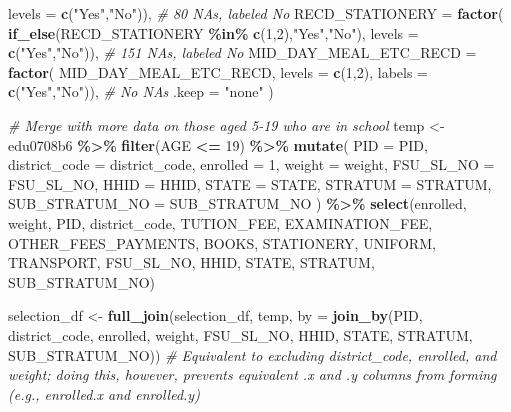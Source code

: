 \documentclass[
]{article}
\newenvironment{Shaded}{\begin{snugshade}}{\end{snugshade}}
\newcommand{\AttributeTok}[1]{\textcolor[rgb]{0.13,0.29,0.53}{#1}}
\newcommand{\CommentTok}[1]{\textcolor[rgb]{0.56,0.35,0.01}{\textit{#1}}}
\newcommand{\DecValTok}[1]{\textcolor[rgb]{0.00,0.00,0.81}{#1}}
\newcommand{\FunctionTok}[1]{\textcolor[rgb]{0.13,0.29,0.53}{\textbf{#1}}}
\newcommand{\NormalTok}[1]{#1}
\newcommand{\OtherTok}[1]{\textcolor[rgb]{0.56,0.35,0.01}{#1}}
\newcommand{\SpecialCharTok}[1]{\textcolor[rgb]{0.81,0.36,0.00}{\textbf{#1}}}
\newcommand{\StringTok}[1]{\textcolor[rgb]{0.31,0.60,0.02}{#1}}
\newcounter{none} %
\begin{document}
\begin{Shaded}
\begin{Highlighting}[]
      \AttributeTok{levels =} \FunctionTok{c}\NormalTok{(}\StringTok{"Yes"}\NormalTok{,}\StringTok{"No"}\NormalTok{)), }\CommentTok{\# 80 NAs, labeled No}
    \AttributeTok{RECD\_STATIONERY =} \FunctionTok{factor}\NormalTok{(}
      \FunctionTok{if\_else}\NormalTok{(RECD\_STATIONERY }\SpecialCharTok{\%in\%} \FunctionTok{c}\NormalTok{(}\DecValTok{1}\NormalTok{,}\DecValTok{2}\NormalTok{),}\StringTok{"Yes"}\NormalTok{,}\StringTok{"No"}\NormalTok{), }
      \AttributeTok{levels =} \FunctionTok{c}\NormalTok{(}\StringTok{"Yes"}\NormalTok{,}\StringTok{"No"}\NormalTok{)), }\CommentTok{\# 151 NAs, labeled No}
    \AttributeTok{MID\_DAY\_MEAL\_ETC\_RECD =} \FunctionTok{factor}\NormalTok{(}
\NormalTok{      MID\_DAY\_MEAL\_ETC\_RECD, }
      \AttributeTok{levels =} \FunctionTok{c}\NormalTok{(}\DecValTok{1}\NormalTok{,}\DecValTok{2}\NormalTok{), }
      \AttributeTok{labels =} \FunctionTok{c}\NormalTok{(}\StringTok{"Yes"}\NormalTok{,}\StringTok{"No"}\NormalTok{)), }\CommentTok{\# No NAs}
    \AttributeTok{.keep =} \StringTok{"none"}
\NormalTok{  )}


\CommentTok{\# Merge with more data on those aged 5{-}19 who are in school}
\NormalTok{temp }\OtherTok{\textless{}{-}}\NormalTok{ edu0708b6 }\SpecialCharTok{\%\textgreater{}\%}
  \FunctionTok{filter}\NormalTok{(AGE }\SpecialCharTok{\textless{}=} \DecValTok{19}\NormalTok{) }\SpecialCharTok{\%\textgreater{}\%}
  \FunctionTok{mutate}\NormalTok{(}
    \AttributeTok{PID =}\NormalTok{ PID,}
    \AttributeTok{district\_code =}\NormalTok{ district\_code,}
    \AttributeTok{enrolled =} \DecValTok{1}\NormalTok{,}
    \AttributeTok{weight =}\NormalTok{ weight,}
    \AttributeTok{FSU\_SL\_NO =}\NormalTok{ FSU\_SL\_NO,}
    \AttributeTok{HHID =}\NormalTok{ HHID,}
    \AttributeTok{STATE =}\NormalTok{ STATE, }
    \AttributeTok{STRATUM =}\NormalTok{ STRATUM, }
    \AttributeTok{SUB\_STRATUM\_NO =}\NormalTok{ SUB\_STRATUM\_NO}
\NormalTok{  ) }\SpecialCharTok{\%\textgreater{}\%}
  \FunctionTok{select}\NormalTok{(enrolled, weight, PID, district\_code, TUTION\_FEE, EXAMINATION\_FEE, OTHER\_FEES\_PAYMENTS, BOOKS, STATIONERY, UNIFORM, TRANSPORT, FSU\_SL\_NO, HHID, STATE, STRATUM, SUB\_STRATUM\_NO)}

\NormalTok{selection\_df }\OtherTok{\textless{}{-}} \FunctionTok{full\_join}\NormalTok{(selection\_df, temp, }\AttributeTok{by =} \FunctionTok{join\_by}\NormalTok{(PID, district\_code, enrolled, weight, FSU\_SL\_NO, HHID, STATE, STRATUM, SUB\_STRATUM\_NO)) }\CommentTok{\# Equivalent to excluding district\_code, enrolled, and weight; doing this, however, prevents equivalent .x and .y columns from forming (e.g., enrolled.x and enrolled.y)}



\end{Highlighting}
\end{Shaded}
\end{document}
